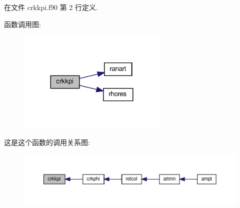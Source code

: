 在文件 crkkpi.\+f90 第 2 行定义.

函数调用图\+:
\nopagebreak
\begin{figure}[H]
\begin{center}
\leavevmode
\includegraphics[width=203pt]{crkkpi_8f90_aafa15990bea1d1763e61f0a791e78b6b_cgraph}
\end{center}
\end{figure}
这是这个函数的调用关系图\+:
\nopagebreak
\begin{figure}[H]
\begin{center}
\leavevmode
\includegraphics[width=350pt]{crkkpi_8f90_aafa15990bea1d1763e61f0a791e78b6b_icgraph}
\end{center}
\end{figure}

